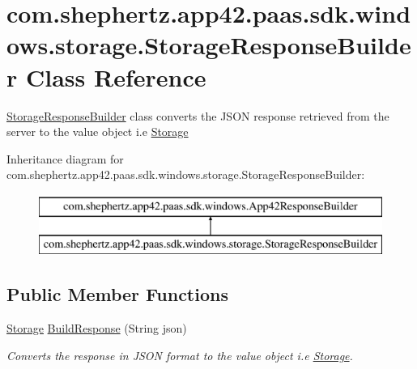 \hypertarget{classcom_1_1shephertz_1_1app42_1_1paas_1_1sdk_1_1windows_1_1storage_1_1_storage_response_builder}{\section{com.\+shephertz.\+app42.\+paas.\+sdk.\+windows.\+storage.\+Storage\+Response\+Builder Class Reference}
\label{classcom_1_1shephertz_1_1app42_1_1paas_1_1sdk_1_1windows_1_1storage_1_1_storage_response_builder}
}


\hyperlink{classcom_1_1shephertz_1_1app42_1_1paas_1_1sdk_1_1windows_1_1storage_1_1_storage_response_builder}{Storage\+Response\+Builder} class converts the J\+S\+O\+N response retrieved from the server to the value object i.\+e \hyperlink{classcom_1_1shephertz_1_1app42_1_1paas_1_1sdk_1_1windows_1_1storage_1_1_storage}{Storage}  


Inheritance diagram for com.\+shephertz.\+app42.\+paas.\+sdk.\+windows.\+storage.\+Storage\+Response\+Builder\+:\begin{figure}[H]
\begin{center}
\leavevmode
\includegraphics[height=2.000000cm]{classcom_1_1shephertz_1_1app42_1_1paas_1_1sdk_1_1windows_1_1storage_1_1_storage_response_builder}
\end{center}
\end{figure}
\subsection*{Public Member Functions}
\begin{DoxyCompactItemize}
\item 
\hyperlink{classcom_1_1shephertz_1_1app42_1_1paas_1_1sdk_1_1windows_1_1storage_1_1_storage}{Storage} \hyperlink{classcom_1_1shephertz_1_1app42_1_1paas_1_1sdk_1_1windows_1_1storage_1_1_storage_response_builder_adda3ee926c15440629f1b1a572e05fbe}{Build\+Response} (String json)
\begin{DoxyCompactList}\small\item\em Converts the response in J\+S\+O\+N format to the value object i.\+e \hyperlink{classcom_1_1shephertz_1_1app42_1_1paas_1_1sdk_1_1windows_1_1storage_1_1_storage}{Storage}. \end{DoxyCompactList}\end{DoxyCompactItemize}


